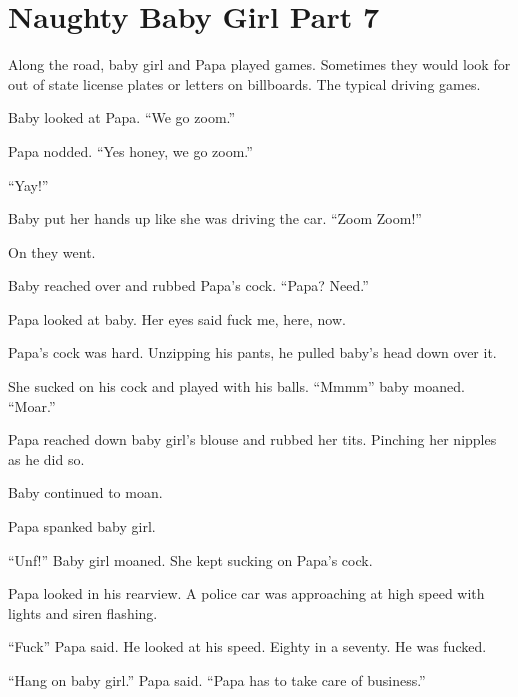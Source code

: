 \section{Naughty Baby Girl Part 7}

    Along the road, baby girl and Papa played games. Sometimes they would look for out of state license plates or letters on billboards. The typical driving games.

    Baby looked at Papa. “We go zoom.”

    Papa nodded. “Yes honey, we go zoom.”

    “Yay!”

    Baby put her hands up like she was driving the car. “Zoom Zoom!”

    On they went.

    Baby reached over and rubbed Papa’s cock. “Papa? Need.”

    Papa looked at baby. Her eyes said fuck me, here, now.

    Papa’s cock was hard. Unzipping his pants, he pulled baby’s head down over it.

    She sucked on his cock and played with his balls. “Mmmm” baby moaned. “Moar.”

    Papa reached down baby girl’s blouse and rubbed her tits. Pinching her nipples as he did so.

    Baby continued to moan.

    Papa spanked baby girl.

    “Unf!” Baby girl moaned. She kept sucking on Papa’s cock.

    Papa looked in his rearview. A police car was approaching at high speed with lights and siren flashing.

    “Fuck” Papa said. He looked at his speed. Eighty in a seventy. He was fucked.

    “Hang on baby girl.” Papa said. “Papa has to take care of business.”

